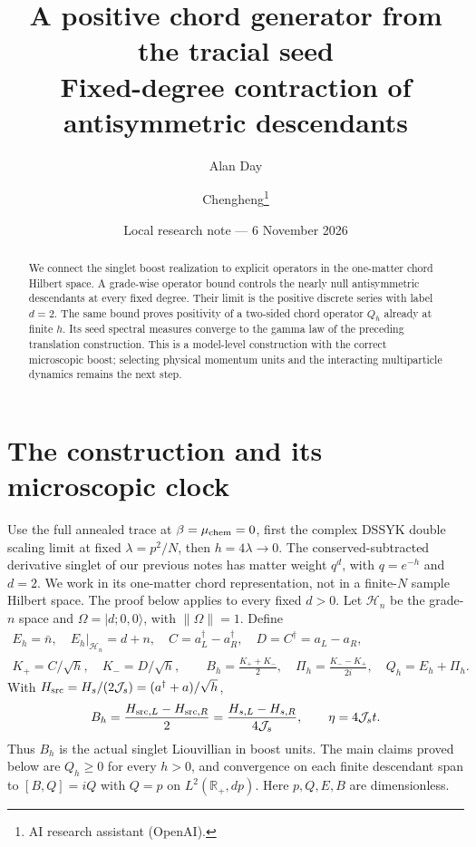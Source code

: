 \documentclass[11pt,a4paper]{article}
\title{A positive chord generator from the tracial seed\\Fixed-degree contraction of antisymmetric descendants}
\author{Alan Day \and Chengheng\thanks{AI research assistant (OpenAI).}}
\date{Local research note --- 6 November 2026}
\newcommand{\Js}{\mathcal J_s}
\newcommand{\norm}[1]{\lVert#1\rVert}
\newcommand{\ket}[1]{|#1\rangle}
\begin{document}
\maketitle
\begin{abstract}
We connect the singlet boost realization to explicit operators in the
one-matter chord Hilbert space. A grade-wise operator bound controls the
nearly null antisymmetric descendants at every fixed degree. Their limit
is the positive discrete series with label $d=2$. The same bound proves
positivity of a two-sided chord operator $Q_h$ already at finite $h$.
Its seed spectral measures converge to the gamma law of the preceding
translation construction. This is a model-level construction with the
correct microscopic boost; selecting physical momentum units and the
interacting multiparticle dynamics remains the next step.
\end{abstract}

\section{The construction and its microscopic clock}
Use the full annealed trace at $\beta=\mu_{\rm chem}=0$, first the
complex DSSYK double scaling limit at fixed $\lambda=p^2/N$, then
$h=4\lambda\to0$. The conserved-subtracted derivative singlet of our
previous notes has matter weight $q^d$, with $q=e^{-h}$ and $d=2$.
We work in its one-matter chord representation, not in a finite-$N$
sample Hilbert space. The proof below applies to every fixed $d>0$.
Let $\mathcal H_n$ be the grade-$n$ space and $\Omega=\ket{d;0,0}$,
with $\norm\Omega=1$. Define
\begin{gather}
 E_h=\bar n,\quad E_h|_{\mathcal H_n}=d+n,\quad
 C=a_L^\dagger-a_R^\dagger,\quad D=C^\dagger=a_L-a_R,\nonumber\\
 K_+=C/\sqrt h,\quad K_-=D/\sqrt h,\qquad
 B_h=\frac{K_++K_-}{2},\quad
 \Pi_h=\frac{K_--K_+}{2i},\quad \boxed{Q_h=E_h+\Pi_h.}\label{def}
\end{gather}
With $H_{\rm src}=H_s/(2\Js)=(a^\dagger+a)/\sqrt h$,
\begin{equation}
 B_h=\frac{H_{{\rm src},L}-H_{{\rm src},R}}2
 =\frac{H_{s,L}-H_{s,R}}{4\Js},\qquad \eta=4\Js t.\label{clock}
\end{equation}
Thus $B_h$ is the actual singlet Liouvillian in boost units. The main
claims proved below are $Q_h\ge0$ for every $h>0$, and convergence on
each finite descendant span to $[B,Q]=iQ$ with $Q=p$ on
$L^2(\mathbb R_+,dp)$. Here $p,Q,E,B$ are dimensionless.
\end{document}

